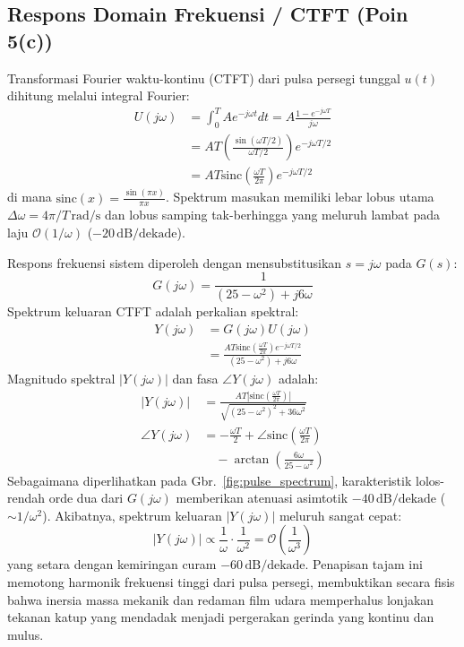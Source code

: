 \documentclass[journal]{IEEEtran}
\begin{document}
\subsection{Respons Domain Frekuensi / CTFT (Poin 5(c))}
Transformasi Fourier waktu-kontinu (CTFT) dari pulsa persegi tunggal $u(t)$ dihitung melalui integral Fourier:
\begin{align}
    U(j\omega) &= \int_0^T A e^{-j\omega t} dt = A \frac{1 - e^{-j\omega T}}{j\omega} \nonumber \\
    &= A T \left( \frac{\sin(\omega T / 2)}{\omega T / 2} \right) e^{-j\omega T / 2} \nonumber \\
    &= A T \text{sinc}\left(\frac{\omega T}{2\pi}\right) e^{-j\omega T / 2}
    \label{eq:U_jw}
\end{align}
di mana $\text{sinc}(x) = \frac{\sin(\pi x)}{\pi x}$. Spektrum masukan memiliki lebar lobus utama $\Delta \omega = 4\pi/T\,\text{rad/s}$ dan lobus samping tak-berhingga yang meluruh lambat pada laju $\mathcal{O}(1/\omega)$ ($-\!20\,\text{dB/dekade}$).

Respons frekuensi sistem diperoleh dengan mensubstitusikan $s = j\omega$ pada $G(s)$:
\begin{equation}
    G(j\omega) = \frac{1}{(25 - \omega^2) + j 6\omega}
    \label{eq:G_jw_ctft}
\end{equation}
Spektrum keluaran CTFT adalah perkalian spektral:
\begin{align}
    Y(j\omega) &= G(j\omega) U(j\omega) \nonumber \\
    &= \frac{A T \text{sinc}\left(\frac{\omega T}{2\pi}\right) e^{-j\omega T / 2}}{(25 - \omega^2) + j 6\omega}
    \label{eq:Y_jw}
\end{align}
Magnitudo spektral $|Y(j\omega)|$ dan fasa $\angle Y(j\omega)$ adalah:
\begin{align}
    |Y(j\omega)| &= \frac{A T \left| \text{sinc}\left(\frac{\omega T}{2\pi}\right) \right|}{\sqrt{(25 - \omega^2)^2 + 36\omega^2}} \label{eq:mag_Y_jw} \\
    \angle Y(j\omega) &= -\frac{\omega T}{2} + \angle\text{sinc}\left(\frac{\omega T}{2\pi}\right) \nonumber \\
    &\quad - \arctan\left(\frac{6\omega}{25 - \omega^2}\right) \label{eq:phase_Y_jw}
\end{align}
Sebagaimana diperlihatkan pada Gbr.~\ref{fig:pulse_spectrum}, karakteristik lolos-rendah orde dua dari $G(j\omega)$ memberikan atenuasi asimtotik $-\!40\,\text{dB/dekade}$ ($\sim 1/\omega^2$). Akibatnya, spektrum keluaran $|Y(j\omega)|$ meluruh sangat cepat:
\begin{equation}
    |Y(j\omega)| \propto \frac{1}{\omega} \cdot \frac{1}{\omega^2} = \mathcal{O}\left(\frac{1}{\omega^3}\right)
\end{equation}
yang setara dengan kemiringan curam $-\!60\,\text{dB/dekade}$. Penapisan tajam ini memotong harmonik frekuensi tinggi dari pulsa persegi, membuktikan secara fisis bahwa inersia massa mekanik dan redaman film udara memperhalus lonjakan tekanan katup yang mendadak menjadi pergerakan gerinda yang kontinu dan mulus.
\end{document}
